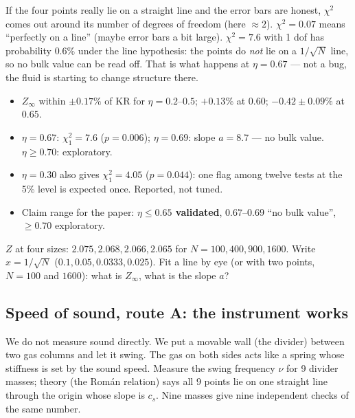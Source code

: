 \documentclass[11pt,a4paper]{article}
\begin{document}
\begin{eli}
If the four points really lie on a straight line and the error bars are honest, $\chi^2$ comes out around its number of degrees of freedom (here $\approx2$). $\chi^2 = 0.07$ means ``perfectly on a line'' (maybe error bars a bit large). $\chi^2 = 7.6$ with 1 dof has probability $0.6\%$ under the line hypothesis: the points do \emph{not} lie on a $1/\sqrt N$ line, so no bulk value can be read off. That is what happens at $\eta = 0.67$ --- not a bug, the fluid is starting to change structure there.
\end{eli}

\begin{num}
\begin{itemize}[nosep]
\item $Z_\infty$ within $\pm0.17\%$ of KR for $\eta = 0.2$--$0.5$; $+0.13\%$ at $0.60$; $-0.42\pm0.09\%$ at $0.65$.
\item $\eta = 0.67$: $\chi^2_1 = 7.6$ ($p = 0.006$); $\eta = 0.69$: slope $a = 8.7$ --- no bulk value. $\eta \ge 0.70$: exploratory.
\item $\eta = 0.30$ also gives $\chi^2_1 = 4.05$ ($p = 0.044$): one flag among twelve tests at the 5\% level is expected once. Reported, not tuned.
\item Claim range for the paper: \textbf{$\eta \le 0.65$ validated}, $0.67$--$0.69$ ``no bulk value'', $\ge0.70$ exploratory.
\end{itemize}
\end{num}

\begin{ex}[Exercise 1]
$Z$ at four sizes: $2.075, 2.068, 2.066, 2.065$ for $N = 100, 400, 900, 1600$. Write $x = 1/\sqrt N$ ($0.1, 0.05, 0.0333, 0.025$). Fit a line by eye (or with two points, $N = 100$ and $1600$): what is $Z_\infty$, what is the slope $a$?
\end{ex}

\subsection{Speed of sound, route A: the instrument works}

\begin{eli}
We do not measure sound directly. We put a movable wall (the divider) between two gas columns and let it swing. The gas on both sides acts like a spring whose stiffness is set by the sound speed. Measure the swing frequency $\nu$ for 9 divider masses; theory (the Román relation) says all 9 points lie on one straight line through the origin whose slope is $c_s$. Nine masses give nine independent checks of the same number.
\end{eli}
\end{document}
